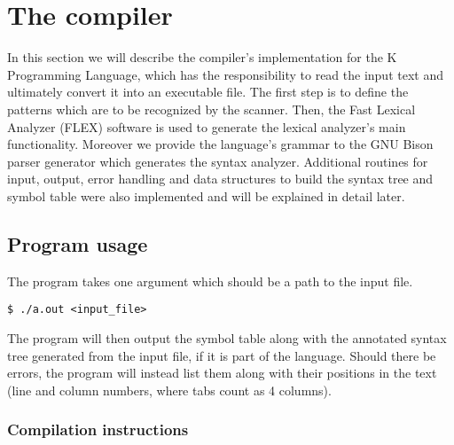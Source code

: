 \section{The compiler}
In this section we will describe the compiler's implementation for the K Programming Language,
which has the responsibility to read the input text and ultimately convert it into an
executable file. The first step is to define the patterns which are to be recognized by the scanner.
Then, the Fast Lexical Analyzer (FLEX) \cite{FLEX} software is used to generate the lexical
analyzer's main functionality. Moreover we provide the language's grammar to the GNU Bison parser
generator \cite{BISON} which generates the syntax analyzer. Additional routines for input, output,
error handling and data structures to build the syntax tree and symbol table were also implemented
and will be explained in detail later.


\subsection{Program usage}
The program takes one argument which should be a path to the input file.

\begin{lstlisting}
$ ./a.out <input_file>
\end{lstlisting}

The program will then output the symbol table along with the
annotated syntax tree generated from the input file, if it is part of the language.
Should there be errors, the program will instead list them along with their
positions in the text (line and column numbers, where tabs count as 4 columns).

\subsubsection{Compilation instructions}

